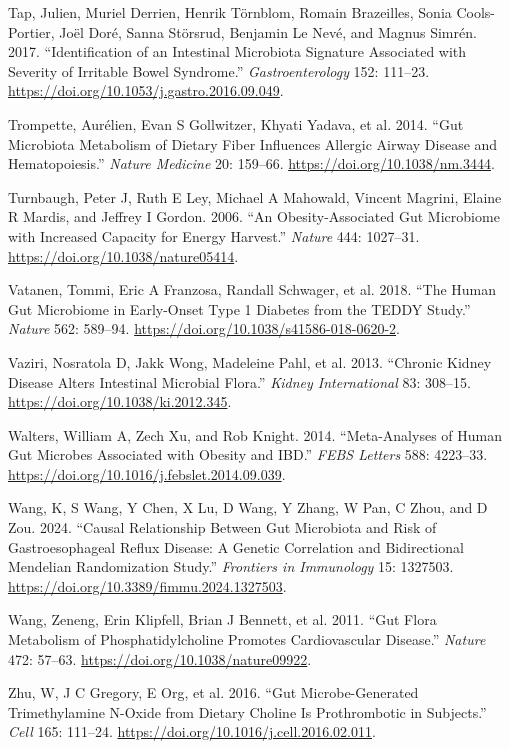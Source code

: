 \documentclass[
  11pt,
]{article}
\newlength{\cslhangindent}
\newenvironment{CSLReferences}[2] %
 {\begin{list}{}{%
  \setlength{\itemindent}{0pt}
  \setlength{\leftmargin}{0pt}
  \setlength{\parsep}{0pt}
  \ifodd #1
   \setlength{\leftmargin}{\cslhangindent}
   \setlength{\itemindent}{-1\cslhangindent}
  \fi
  \setlength{\itemsep}{#2\baselineskip}}}
 {\end{list}}
\begin{document}
\begin{CSLReferences}{1}{0}
Tap, Julien, Muriel Derrien, Henrik Törnblom, Romain Brazeilles, Sonia
Cools-Portier, Joël Doré, Sanna Störsrud, Benjamin Le Nevé, and Magnus
Simrén. 2017. {``Identification of an Intestinal Microbiota Signature
Associated with Severity of Irritable Bowel Syndrome.''}
\emph{Gastroenterology} 152: 111--23.
\url{https://doi.org/10.1053/j.gastro.2016.09.049}.

Trompette, Aurélien, Evan S Gollwitzer, Khyati Yadava, et al. 2014.
{``Gut Microbiota Metabolism of Dietary Fiber Influences Allergic Airway
Disease and Hematopoiesis.''} \emph{Nature Medicine} 20: 159--66.
\url{https://doi.org/10.1038/nm.3444}.

Turnbaugh, Peter J, Ruth E Ley, Michael A Mahowald, Vincent Magrini,
Elaine R Mardis, and Jeffrey I Gordon. 2006. {``An Obesity-Associated
Gut Microbiome with Increased Capacity for Energy Harvest.''}
\emph{Nature} 444: 1027--31. \url{https://doi.org/10.1038/nature05414}.

Vatanen, Tommi, Eric A Franzosa, Randall Schwager, et al. 2018. {``The
Human Gut Microbiome in Early-Onset Type 1 Diabetes from the {TEDDY}
Study.''} \emph{Nature} 562: 589--94.
\url{https://doi.org/10.1038/s41586-018-0620-2}.

Vaziri, Nosratola D, Jakk Wong, Madeleine Pahl, et al. 2013. {``Chronic
Kidney Disease Alters Intestinal Microbial Flora.''} \emph{Kidney
International} 83: 308--15. \url{https://doi.org/10.1038/ki.2012.345}.

Walters, William A, Zech Xu, and Rob Knight. 2014. {``Meta-Analyses of
Human Gut Microbes Associated with Obesity and {IBD}.''} \emph{FEBS
Letters} 588: 4223--33.
\url{https://doi.org/10.1016/j.febslet.2014.09.039}.

Wang, K, S Wang, Y Chen, X Lu, D Wang, Y Zhang, W Pan, C Zhou, and D
Zou. 2024. {``Causal Relationship Between Gut Microbiota and Risk of
Gastroesophageal Reflux Disease: A Genetic Correlation and Bidirectional
{M}endelian Randomization Study.''} \emph{Frontiers in Immunology} 15:
1327503. \url{https://doi.org/10.3389/fimmu.2024.1327503}.

Wang, Zeneng, Erin Klipfell, Brian J Bennett, et al. 2011. {``Gut Flora
Metabolism of Phosphatidylcholine Promotes Cardiovascular Disease.''}
\emph{Nature} 472: 57--63. \url{https://doi.org/10.1038/nature09922}.

Zhu, W, J C Gregory, E Org, et al. 2016. {``Gut Microbe-Generated
Trimethylamine {N}-Oxide from Dietary Choline Is Prothrombotic in
Subjects.''} \emph{Cell} 165: 111--24.
\url{https://doi.org/10.1016/j.cell.2016.02.011}.

\end{CSLReferences}
\end{document}
